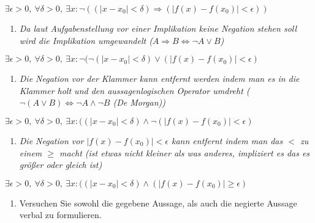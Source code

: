 \begin{center}
$\exists \epsilon > 0, \ \forall \delta > 0, \ \exists x : \lnot ((| x - x_0 | < \delta) \Rightarrow (| f(x) - f(x_0)| < \epsilon))$
\end{center}

\begin{enumerate}[label={3.}, leftmargin=*]
\item \textit{Da laut Aufgabenstellung vor einer Implikation keine Negation stehen soll wird die Implikation umgewandelt ($A \Rightarrow B \Leftrightarrow \lnot A \lor B$)}
\end{enumerate}

\begin{center}
$\exists \epsilon > 0, \ \forall \delta > 0, \ \exists x : \lnot (\lnot (|x - x_0| < \delta) \lor (|f(x) - f(x_0)| < \epsilon)$
\end{center}

\begin{enumerate}[label={4.}, leftmargin=*]
\item \textit{Die Negation vor der Klammer kann entfernt werden indem man es in die Klammer holt und den aussagenlogischen Operator umdreht ($\lnot(A \lor B) \Leftrightarrow \lnot A \land \lnot B$ (De Morgan))}
\end{enumerate}

\begin{center}
$\exists \epsilon > 0, \ \forall \delta > 0, \ \exists x : ((|x - x_0| < \delta) \land \lnot (|f(x) - f(x_0)| < \epsilon)$
\end{center}

\begin{enumerate}[label={5.}, leftmargin=*]
\item \textit{Die Negation vor $|f(x) - f(x_0)| < \epsilon$ kann entfernt indem man das $<$ zu einem $\geq$ macht (ist etwas nicht kleiner als was anderes, impliziert es das es größer oder gleich ist)}
\end{enumerate}

\begin{center}
$\exists \epsilon > 0, \ \forall \delta > 0, \ \exists x : ((|x - x_0| < \delta) \land (|f(x) - f(x_0)| \geq \epsilon)$
\end{center}

\begin{enumerate}[label={c)}, leftmargin=*]
\item Versuchen Sie sowohl die gegebene Aussage, als auch die negierte Aussage verbal zu formulieren.
\end{enumerate}